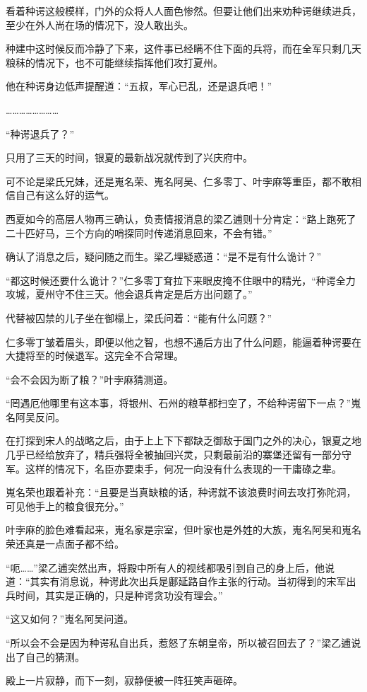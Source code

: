 看着种谔这般模样，门外的众将人人面色惨然。但要让他们出来劝种谔继续进兵，至少在外人尚在场的情况下，没人敢出头。

种建中这时候反而冷静了下来，这件事已经瞒不住下面的兵将，而在全军只剩几天粮秣的情况下，也不可能继续指挥他们攻打夏州。

他在种谔身边低声提醒道：“五叔，军心已乱，还是退兵吧！”

……………………

“种谔退兵了？”

只用了三天的时间，银夏的最新战况就传到了兴庆府中。

可不论是梁氏兄妹，还是嵬名荣、嵬名阿吴、仁多零丁、叶孛麻等重臣，都不敢相信自己有这么好的运气。

西夏如今的高层人物再三确认，负责情报消息的梁乙逋则十分肯定：“路上跑死了二十匹好马，三个方向的哨探同时传递消息回来，不会有错。”

确认了消息之后，疑问随之而生。梁乙埋疑惑道：“是不是有什么诡计？”

“都这时候还要什么诡计？”仁多零丁耷拉下来眼皮掩不住眼中的精光，“种谔全力攻城，夏州守不住三天。他会退兵肯定是后方出问题了。”

代替被囚禁的儿子坐在御榻上，梁氏问着：“能有什么问题？”

仁多零丁皱着眉头，即便以他之智，也想不通后方出了什么问题，能逼着种谔要在大捷将至的时候退军。这完全不合常理。

“会不会因为断了粮？”叶孛麻猜测道。

“罔遇厄他哪里有这本事，将银州、石州的粮草都扫空了，不给种谔留下一点？”嵬名阿吴反问。

在打探到宋人的战略之后，由于上上下下都缺乏御敌于国门之外的决心，银夏之地几乎已经给放弃了，精兵强将全被抽回兴灵，只剩最前沿的寨堡还留有一部分守军。这样的情况下，名臣亦要束手，何况一向没有什么表现的一干庸碌之辈。

嵬名荣也跟着补充：“且要是当真缺粮的话，种谔就不该浪费时间去攻打弥陀洞，可见他手上的粮食很充分。”

叶孛麻的脸色难看起来，嵬名家是宗室，但叶家也是外姓的大族，嵬名阿吴和嵬名荣还真是一点面子都不给。

“呃……”梁乙逋突然出声，将殿中所有人的视线都吸引到自己的身上后，他说道：“其实有消息说，种谔此次出兵是鄜延路自作主张的行动。当初得到的宋军出兵时间，其实是正确的，只是种谔贪功没有理会。”

“这又如何？”嵬名阿吴问道。

“所以会不会是因为种谔私自出兵，惹怒了东朝皇帝，所以被召回去了？”梁乙逋说出了自己的猜测。

殿上一片寂静，而下一刻，寂静便被一阵狂笑声砸碎。

